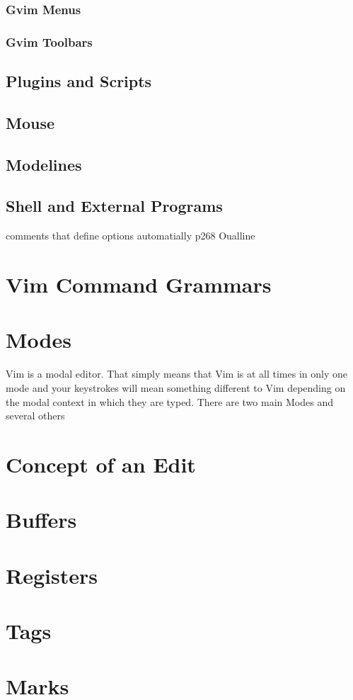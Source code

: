 \documentclass[12pt, oneside]{book}
\begin{document}
    \subsubsection{Gvim Menus}
    \subsubsection{Gvim Toolbars}
  \subsection{Plugins and Scripts}
  \subsection{Mouse}
  \subsection{Modelines}
  \subsection{Shell and External Programs}
comments that define options automatially p268 Oualline
\section{Vim Command Grammars}
\section{Modes}
Vim is a modal editor.  That simply means that Vim is at all times in only one mode and your keystrokes will mean something different to Vim depending on the modal context in which they are typed.  There
are two main Modes and several others
\section{Concept of an Edit}
\section{Buffers}
\section{Registers}
\section{Tags}
\section{Marks}
\end{document}
